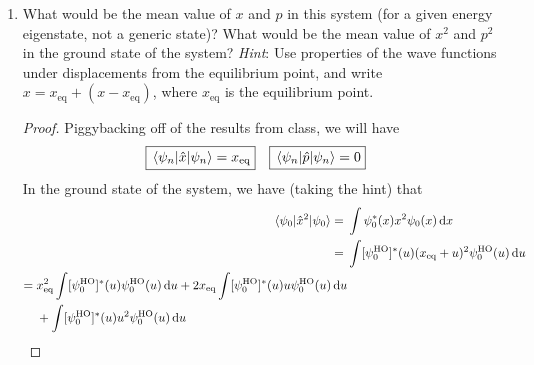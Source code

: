 \documentclass[../psets.tex]{subfiles}
\begin{document}
\begin{enumerate}
\begin{enumerate}
\begin{proof}
\begin{align*}
                -\frac{\hbar^2}{2m}\dv{u}\left[ \dv{u}\psi_n(u) \right]\cdot\underbrace{\dv{u}{x}}_1+\frac{m\omega^2u^2}{2}\psi_n(u) &= E_n\psi_n(u)\\
                -\frac{\hbar^2}{2m}\dv[2]{u}\psi_n(u)+\frac{m\omega^2u^2}{2}\psi_n(u) &= E_n\psi_n(u)
            \end{align*}
            We worked out the solutions to this equation already in class. They are
            \begin{align*}
                \psi_n(u) &= \psi_n^\text{HO}(u)&
                E_n-C &= E_n^\text{HO}
            \end{align*}
            It follows by returning the substitution that
            \begin{align*}
                \Aboxed{\psi_n(x) &= \psi_n^\text{HO}(x-x_\text{eq})}&
                \Aboxed{E_n &= E_n^\text{HO}+C}
            \end{align*}
        \end{proof}
        \item What would be the mean value of $x$ and $p$ in this system (for a given energy eigenstate, not a generic state)? What would be the mean value of $x^2$ and $p^2$ in the ground state of the system? \emph{Hint}: Use properties of the wave functions under displacements from the equilibrium point, and write $x=x_\text{eq}+(x-x_\text{eq})$, where $x_\text{eq}$ is the equilibrium point.
        \begin{proof}
            Piggybacking off of the results from class, we will have
            \begin{align*}
                \Aboxed{\ev{\hat{x}}{\psi_n} &= x_\text{eq}}&
                \Aboxed{\ev{\hat{p}}{\psi_n} &= 0}
            \end{align*}
            In the ground state of the system, we have (taking the hint) that
            \begin{align*}
                \ev{\hat{x}^2}{\psi_0} ={}& \int\psi_0^*(x)x^2\psi_0(x)\dd{x}\\
                ={}& \int[\psi_0^\text{HO}]^*(u)(x_\text{eq}+u)^2\psi_0^\text{HO}(u)\dd{u}\\
                \begin{split}
                    ={}& x_\text{eq}^2\int[\psi_0^\text{HO}]^*(u)\psi_0^\text{HO}(u)\dd{u}+2x_\text{eq}\int[\psi_0^\text{HO}]^*(u)u\psi_0^\text{HO}(u)\dd{u}\\
                    & +\int[\psi_0^\text{HO}]^*(u)u^2\psi_0^\text{HO}(u)\dd{u}
                \end{split}

\end{align*}
\end{proof}
\end{enumerate}
\end{enumerate}
\end{document}
